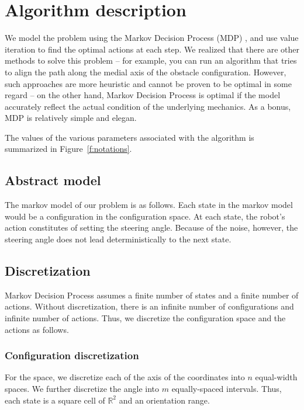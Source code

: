 \documentclass[a4paper]{article}
\begin{document}
\section{Algorithm description}
We model the problem using the Markov Decision Process (MDP) \cite{mdp},
and use value iteration
to find the optimal actions at each step. We realized that there are other
methods to solve this problem -- for example, you can run an algorithm that
tries to align the path along the medial axis of the obstacle configuration.
However, such approaches are more heuristic and cannot be proven to be
optimal in some regard -- on the other hand, Markov Decision Process is
optimal if the model accurately reflect the actual condition of the underlying
mechanics. As a bonus, MDP is relatively simple and elegan.

The values of the various parameters associated with the algorithm is
summarized in Figure~\ref{f:notations}.

\subsection{Abstract model}

The markov model of our problem is as follows. Each state in the markov model
would be a configuration in the configuration space. At each state, the robot's
action constitutes of setting the steering angle. Because of the noise, however,
the steering angle does not lead deterministically to the next state.

\subsection{Discretization}
Markov Decision Process assumes a finite number of states and a finite number
of actions. Without discretization, there is an infinite number of
configurations and infinite number of actions. Thus, we discretize the configuration
space and the actions as follows.

\subsubsection{Configuration discretization}
For the space, we discretize each of the axis of the coordinates into $n$
equal-width spaces. We further discretize the angle into $m$ equally-spaced
intervals. Thus, each state is a square cell of $\mathbb{R}^2$ and an orientation
range.
\end{document}
